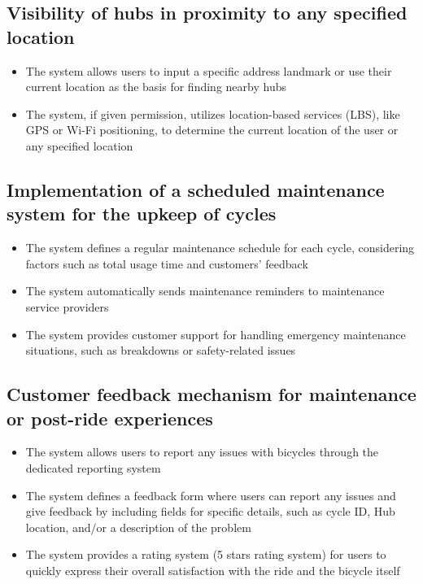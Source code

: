 \documentclass{scrreprt}
\begin{document}
\subsection{Visibility of hubs in proximity to any specified location}
\begin{itemize}
    \item The system allows users to input a specific address landmark or use their current location as the basis for finding nearby hubs
    \item The system, if given permission, utilizes location-based services (LBS), like GPS or Wi-Fi positioning, to determine the current location of the user or any specified location
\end{itemize}

\subsection{Implementation of a scheduled maintenance system for the upkeep of cycles}
\begin{itemize}
    \item The system defines a regular maintenance schedule for each cycle, considering factors such as total usage time and customers' feedback
    \item The system automatically sends maintenance reminders to maintenance service providers
    \item The system provides customer support for handling emergency maintenance situations, such as breakdowns or safety-related issues
\end{itemize}

\subsection{Customer feedback mechanism for maintenance or post-ride experiences}
\begin{itemize}
    \item The system allows users to report any issues with bicycles through the dedicated reporting system
    \item The system defines a feedback form where users can report any issues and give feedback by including fields for specific details, such as cycle ID, Hub location, and/or a description of the problem
    \item The system provides a rating system (5 stars rating system) for users to quickly express their overall satisfaction with the ride and the bicycle itself
\end{itemize}
\end{document}
